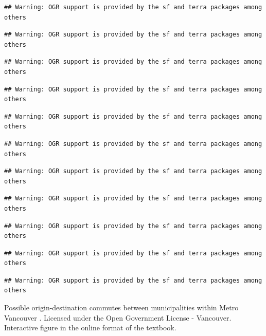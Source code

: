\documentclass[
]{book}
\begin{document}
\begin{verbatim}
## Warning: OGR support is provided by the sf and terra packages among others
\end{verbatim}

\begin{verbatim}
## Warning: OGR support is provided by the sf and terra packages among others
\end{verbatim}

\begin{verbatim}
## Warning: OGR support is provided by the sf and terra packages among others
\end{verbatim}

\begin{verbatim}
## Warning: OGR support is provided by the sf and terra packages among others
\end{verbatim}

\begin{verbatim}
## Warning: OGR support is provided by the sf and terra packages among others
\end{verbatim}

\begin{verbatim}
## Warning: OGR support is provided by the sf and terra packages among others
\end{verbatim}

\begin{verbatim}
## Warning: OGR support is provided by the sf and terra packages among others
\end{verbatim}

\begin{verbatim}
## Warning: OGR support is provided by the sf and terra packages among others
\end{verbatim}

\begin{verbatim}
## Warning: OGR support is provided by the sf and terra packages among others
\end{verbatim}

\begin{verbatim}
## Warning: OGR support is provided by the sf and terra packages among others
\end{verbatim}

\begin{verbatim}
## Warning: OGR support is provided by the sf and terra packages among others
\end{verbatim}

\label{fig:8-origin-destination}Possible origin-destination commutes between municipalities within Metro Vancouver \citep{city_of_vancouver_open_nodate}. Licensed under the Open Government License - Vancouver. Interactive figure in the online format of the textbook.
\end{document}
